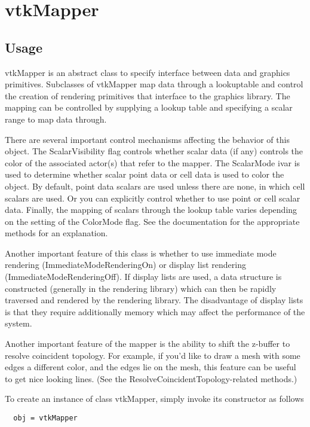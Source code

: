 \section{vtkMapper}

\subsection{Usage}

 vtkMapper is an abstract class to specify interface between data and 
 graphics primitives. Subclasses of vtkMapper map data through a 
 lookuptable and control the creation of rendering primitives that
 interface to the graphics library. The mapping can be controlled by 
 supplying a lookup table and specifying a scalar range to map data
 through.

 There are several important control mechanisms affecting the behavior of
 this object. The ScalarVisibility flag controls whether scalar data (if
 any) controls the color of the associated actor(s) that refer to the
 mapper. The ScalarMode ivar is used to determine whether scalar point data
 or cell data is used to color the object. By default, point data scalars
 are used unless there are none, in which cell scalars are used. Or you can
 explicitly control whether to use point or cell scalar data. Finally, the
 mapping of scalars through the lookup table varies depending on the
 setting of the ColorMode flag. See the documentation for the appropriate
 methods for an explanation.

 Another important feature of this class is whether to use immediate mode
 rendering (ImmediateModeRenderingOn) or display list rendering
 (ImmediateModeRenderingOff). If display lists are used, a data structure
 is constructed (generally in the rendering library) which can then be
 rapidly traversed and rendered by the rendering library. The disadvantage
 of display lists is that they require additionally memory which may affect
 the performance of the system.

 Another important feature of the mapper is the ability to shift the
 z-buffer to resolve coincident topology. For example, if you'd like to
 draw a mesh with some edges a different color, and the edges lie on the
 mesh, this feature can be useful to get nice looking lines. (See the
 ResolveCoincidentTopology-related methods.)

To create an instance of class vtkMapper, simply
invoke its constructor as follows
\begin{verbatim}
  obj = vtkMapper
\end{verbatim}
